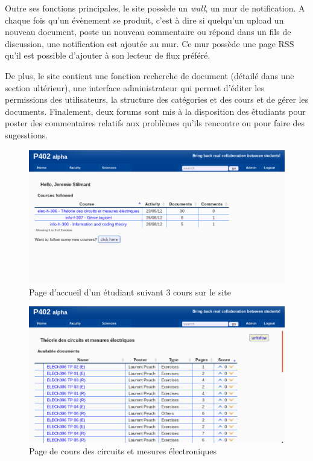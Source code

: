 \documentclass[a4paper,12pt]{article}
\begin{document}
Outre ses fonctions principales, le site possède un \textit{wall}, un mur
de notification. A chaque fois qu'un évènement se produit, c'est à dire
si quelqu'un upload un nouveau document, poste un nouveau commentaire ou répond
dans un fils de discussion, une notification est ajoutée au mur. Ce mur possède
une page RSS qu'il est possible d'ajouter à son lecteur de flux préféré.

De plus, le site contient une fonction recherche de document (détailé dans une
section ultérieur), une interface administrateur qui permet d'éditer les permissions
des utilisateurs, la structure des catégories et des cours et de gérer les documents.
Finalement, deux forums sont mis à la disposition des étudiants pour poster
des commentaires relatifs aux problèmes qu'ils rencontre ou pour faire des sugesstions.

\begin{figure}
  \centering\includegraphics[scale=0.5]{imgs/home.pdf}
  \caption{Page d'accueil d'un étudiant suivant 3 cours sur le site}
  \label{fig:home}
\end{figure}

\begin{figure}
  \centering\includegraphics[scale=0.5]{imgs/cours.pdf}
  \caption{Page de cours des circuits et mesures électroniques}
  \label{fig:course}
\end{figure}
\end{document}
